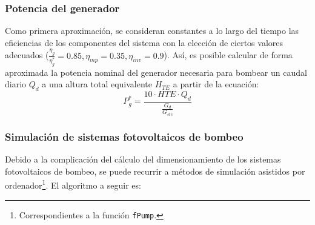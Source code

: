 \subsubsection{Potencia del generador}
\label{sec:orgb3a5008}
Como primera aproximación, se consideran constantes a lo largo del tiempo las eficiencias de los componentes del sistema con la elección de ciertos valores adecuados (\(\frac{\eta_g}{\eta_g^*}=0.85, \eta_{mp}=0.35, \eta_{inv}=0.9\)). Así, es posible calcular de forma aproximada la potencia nominal del generador necesaria para bombear un caudal diario \(Q_d\) a una altura total equivalente \(H_{TE}\) a partir de la ecuación:
\begin{equation}
P^*_g = \frac{10 \cdot HTE \cdot Q_d}{\frac{G_d}{G_{stc}}}
\end{equation}

\subsubsection{Simulación de sistemas fotovoltaicos de bombeo}
\label{sec:orgca46ea8}
Debido a la complicación del cálculo del dimensionamiento de los sistemas fotovoltaicos de bombeo, se puede recurrir a métodos de simulación asistidos por ordenador\footnote{Correspondientes a la función \texttt{fPump}.}. El algoritmo a seguir es:
